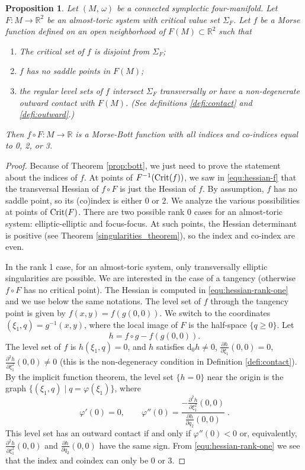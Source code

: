 \documentclass[11pt]{article}
\newtheorem{prop}[theorem]{Proposition}
\newcommand{\phy}{\varphi}
\newcommand{\DD}{\mathrm{d}}
\newcommand{\deriv}[2]{\frac{\partial #1}{\partial #2}}
\newcommand{\RM}{\mathbb{R}}
\renewcommand{\geq}{\geqslant}
\begin{document}
\begin{prop} \label{prop:bott-index} Let $(M,\, \omega)$ be a
  connected symplectic four-manifold.  Let $F:M\to\RM^2$ be an
  almost-toric system with critical value set $\Sigma_F$. Let $f$ be a
  Morse function defined on an open neighborhood of $F(M)\subset\RM^2$
  such that
  \begin{enumerate}[\rm (i)]
  \item \label{bott-index-hyp1} The critical set of $f$ is disjoint
    from $\Sigma_F$;
  \item \label{bott-index-hyp2} $f$ has no saddle points in $F(M)$;
  \item \label{bott-index-hyp3} the regular level sets of $f$
    intersect $\Sigma_F$ transversally or have a non-degenerate
    outward contact with $F(M)$. (See definitions \ref{defi:contact}
    and \ref{defi:outward}.)
  \end{enumerate}
  Then $f\circ F:M\to \RM$ is a Morse-Bott function with all indices
  and co-indices equal to 0, 2, or 3.
\end{prop}
\begin{proof}
  Because of Theorem \ref{prop:bott}, we just need to prove the
  statement about the indices of $f$.  At points of
  $F^{-1}(\textup{Crit}(f))$, we saw in \eqref{equ:hessian-f} that the
  transversal Hessian of $f\circ F$ is just the Hessian of $f$. By
  assumption, $f$ has no saddle point, so its (co)index is either $0$
  or $2$.  We analyze the various possibilities at points of
  $\textup{Crit}(F)$. There are two possible rank 0 cases for an
  almost-toric system: elliptic-elliptic and focus-focus.  At such
  points, the Hessian determinant is positive (see Theorem
  \ref{singularities_theorem}), so the index and co-index are even.

  In the rank 1 case, for an almost-toric system, only transversally
  elliptic singularities are possible.  We are interested in the case
  of a tangency (otherwise $f\circ F$ has no critical point). The
  Hessian is computed in \eqref{equ:hessian-rank-one} and we use below
  the same notations.  The level set of $f$ through the tangency point
  is given by $f(x,y)=f(g(0,0))$. We switch to the coordinates
  $(\xi_1,q)=g^{-1}(x,y)$, where the local image of $F$ is the
  half-space $\{q\geq 0\}$. Let
$$
h=f\circ g-f(g(0,0)).
$$ 
The level set of $f$ is $h(\xi_1,q)=0$, and $h$ satisfies $\DD_0 h\neq
0$, $\deriv{h}{\xi_1}(0,0)=0$, $\frac{\partial^2
  h}{\partial\xi_1^2}(0,0)\neq 0$ (this is the non-degeneracy
condition in Definition \ref{defi:contact}).  By the implicit function
theorem, the level set $\{h=0\}$ near the origin is the graph
$\{(\xi_1,q)\mid q=\phy(\xi_1)\}$, where
\[
\phy'(0)=0, \qquad \phy''(0) = \frac{-\frac{\partial^2
    h}{\partial\xi_1^2}(0,0)} {\deriv{h}{q_2}(0,0)}\;.
\]
This level set has an outward contact if and only if $\phy''(0)<0$ or,
equivalently, $\frac{\partial^2 h}{\partial\xi_1^2}(0,0)$ and
$\deriv{h}{q_2}(0,0)$ have the same sign. From
\eqref{equ:hessian-rank-one} we see that the index and coindex can
only be 0 or 3.
\end{proof}
\end{document}
